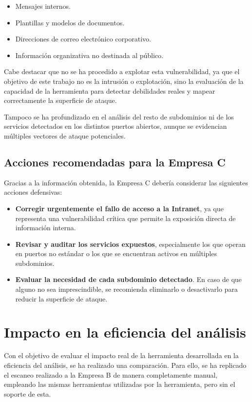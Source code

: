 \begin{parskipenv}
\begin{itemize}
    \item Mensajes internos.
    \item Plantillas y modelos de documentos.
    \item Direcciones de correo electrónico corporativo.
    \item Información organizativa no destinada al público.
\end{itemize}

Cabe destacar que no se ha procedido a explotar esta vulnerabilidad, ya que el objetivo de este trabajo no es la intrusión o explotación, sino la evaluación de la capacidad de la herramienta para detectar debilidades reales y mapear correctamente la superficie de ataque.

Tampoco se ha profundizado en el análisis del resto de subdominios ni de los servicios detectados en los distintos puertos abiertos, aunque se evidencian múltiples vectores de ataque potenciales.

\subsection{Acciones recomendadas para la Empresa C}
Gracias a la información obtenida, la Empresa C debería considerar las siguientes acciones defensivas:

\begin{itemize}
  \item \textbf{Corregir urgentemente el fallo de acceso a la Intranet}, ya que representa una vulnerabilidad crítica que permite la exposición directa de información interna.
  \item \textbf{Revisar y auditar los servicios expuestos}, especialmente los que operan en puertos no estándar o los que se encuentran activos en múltiples subdominios.
  \item \textbf{Evaluar la necesidad de cada subdominio detectado}. En caso de que alguno no sea imprescindible, se recomienda eliminarlo o desactivarlo para reducir la superficie de ataque.
\end{itemize}

\section{Impacto en la eficiencia del análisis}
Con el objetivo de evaluar el impacto real de la herramienta desarrollada en la eficiencia del análisis, se ha realizado una comparación. Para ello, se ha replicado el escaneo realizado a la Empresa B de manera completamente manual, empleando las mismas herramientas utilizadas por la herramienta, pero sin el soporte de esta.


\end{parskipenv}
